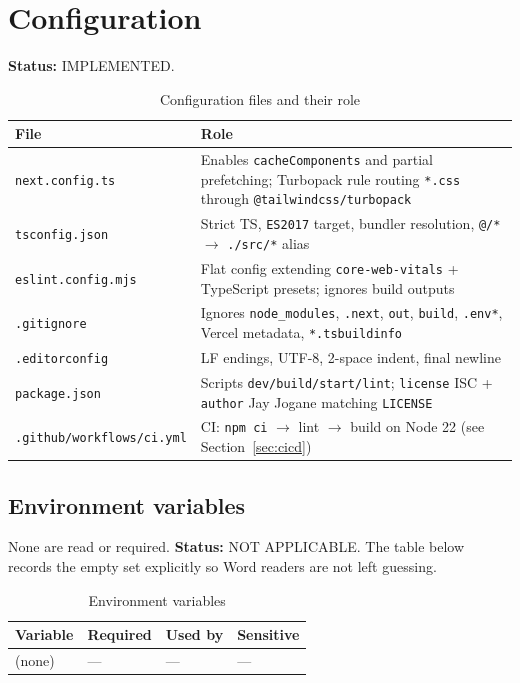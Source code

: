 \section{Configuration}
\label{sec:configuration}

\textbf{Status:} IMPLEMENTED.

\begin{table}[H]
\centering
\caption{Configuration files and their role}
\begin{tabular}{|l|p{8.5cm}|}
\hline
\textbf{File} & \textbf{Role} \\ \hline
\texttt{next.config.ts} & Enables \texttt{cacheComponents} and partial prefetching; Turbopack rule routing \texttt{*.css} through \texttt{@tailwindcss/turbopack} \\ \hline
\texttt{tsconfig.json} & Strict TS, \texttt{ES2017} target, bundler resolution, \texttt{@/*} $\rightarrow$ \texttt{./src/*} alias \\ \hline
\texttt{eslint.config.mjs} & Flat config extending \texttt{core-web-vitals} + TypeScript presets; ignores build outputs \\ \hline
\texttt{.gitignore} & Ignores \texttt{node\_modules}, \texttt{.next}, \texttt{out}, \texttt{build}, \texttt{.env*}, Vercel metadata, \texttt{*.tsbuildinfo} \\ \hline
\texttt{.editorconfig} & LF endings, UTF-8, 2-space indent, final newline \\ \hline
\texttt{package.json} & Scripts \texttt{dev/build/start/lint}; \texttt{license} ISC + \texttt{author} Jay Jogane matching \texttt{LICENSE} \\ \hline
\texttt{.github/workflows/ci.yml} & CI: \texttt{npm ci} $\rightarrow$ lint $\rightarrow$ build on Node 22 (see Section~\ref{sec:cicd}) \\ \hline
\end{tabular}
\end{table}

\subsection{Environment variables}
None are read or required. \textbf{Status:} NOT APPLICABLE. The table below records the empty set explicitly so Word readers are not left guessing.

\begin{table}[H]
\centering
\caption{Environment variables}
\begin{tabular}{|l|l|l|l|}
\hline
\textbf{Variable} & \textbf{Required} & \textbf{Used by} & \textbf{Sensitive} \\ \hline
(none) & --- & --- & --- \\ \hline
\end{tabular}
\end{table}
